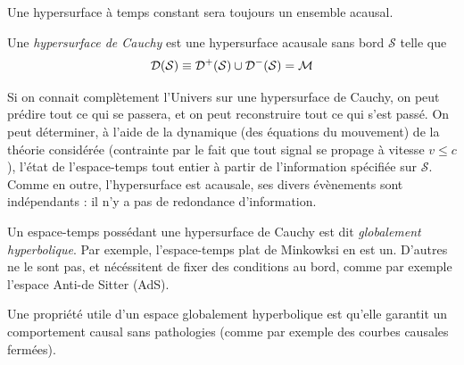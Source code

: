 {\begin{theoremframe}
\end{theoremframe}
Une hypersurface à temps constant sera toujours un ensemble acausal.
\begin{theoremframe}
    \begin{defi}
        Une \emph{hypersurface de Cauchy} est une hypersurface acausale sans bord $\mathcal{S}$ telle que
        \begin{align}
            \mathcal{D}(\mathcal{S}) \equiv \mathcal{D}^+(\mathcal{S}) \cup \mathcal{D}^-(\mathcal{S}) = \mathcal{M}
        \end{align}
    \end{defi}
\end{theoremframe}
Si on connait complètement l'Univers sur une hypersurface de Cauchy, on peut prédire tout ce qui se passera, et on peut reconstruire tout ce qui s'est passé. On peut déterminer, à l'aide de la dynamique (des équations du mouvement) de la théorie considérée (contrainte par le fait que tout signal se propage à vitesse $v \leq c$), l'état de l'espace-temps tout entier à partir de l'information spécifiée sur $\mathcal{S}$. Comme en outre, l'hypersurface est acausale, ses divers évènements sont indépendants : il n'y a pas de redondance d'information.

\begin{rmk}
    Un espace-temps possédant une hypersurface de Cauchy est dit \emph{globalement hyperbolique}. Par exemple, l'espace-temps plat de Minkowksi en est un. D'autres ne le sont pas, et nécéssitent de fixer des conditions au bord, comme par exemple l'espace Anti-de Sitter (AdS).
\end{rmk}
Une propriété utile d'un espace globalement hyperbolique est qu'elle garantit un comportement causal sans pathologies (comme par exemple des courbes causales fermées).

}
